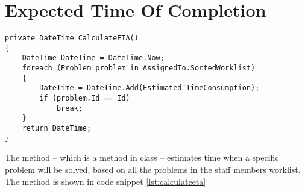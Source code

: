 \section{Expected Time Of Completion}
\label{sec:expected_time_of_completion}



\begin{lstlisting}[style=sourceCode, caption=\myCaption{The CalculateETA method}, label=lst:calculateeta,float=h]
private DateTime CalculateETA()
{
    DateTime DateTime = DateTime.Now;
    foreach (Problem problem in AssignedTo.SortedWorklist)
    {
        DateTime = DateTime.Add(Estimated¨TimeConsumption);
        if (problem.Id == Id)
            break;
    }
    return DateTime;
}
\end{lstlisting}

The  method -- which is a method in  class -- estimates time when a specific problem will be solved, based on all the problems in the staff members worklist. The method is shown in code snippet \ref{lst:calculateeta}
